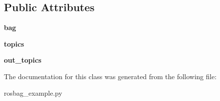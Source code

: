 \subsection*{Public Attributes}
\begin{DoxyCompactItemize}
\item 
\hypertarget{classrosbag__example_1_1bag__writer_a32d4583116a277775bde06ef10dd5c88}{{\bfseries bag}}\label{classrosbag__example_1_1bag__writer_a32d4583116a277775bde06ef10dd5c88}

\item 
\hypertarget{classrosbag__example_1_1bag__writer_acb7f861d76ae18f67c590ac0b69d81ab}{{\bfseries topics}}\label{classrosbag__example_1_1bag__writer_acb7f861d76ae18f67c590ac0b69d81ab}

\item 
\hypertarget{classrosbag__example_1_1bag__writer_af32ea1832e3ca0be7e778f36c3797398}{{\bfseries out\-\_\-topics}}\label{classrosbag__example_1_1bag__writer_af32ea1832e3ca0be7e778f36c3797398}

\end{DoxyCompactItemize}


The documentation for this class was generated from the following file\-:\begin{DoxyCompactItemize}
\item 
rosbag\-\_\-example.\-py\end{DoxyCompactItemize}
